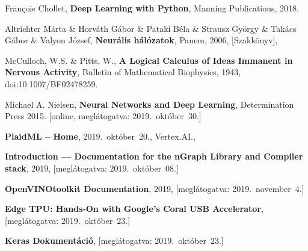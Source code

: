\begin{thebibliography}{9}
	François Chollet,
	\textbf{Deep Learning with Python},
	Manning Publications,
	2018.

	Altrichter Márta \& Horváth Gábor \& Pataki Béla \& Strausz György \& Takács Gábor \& Valyon József,
	\textbf{Neurális hálózatok},
	Panem,
	2006,
	[Szakkönyv],

	McCulloch, W.S. \& Pitts, W.,
	\textbf{A Logical Calculus of Ideas Immanent in Nervous Activity},
	Bulletin of Mathematical Biophysics,
	1943,
	doi:10.1007/BF02478259.

	Michael A. Nielsen,
	\textbf{Neural Networks and Deep Learning},
	Determination Press
	2015.
	[online, meglátogatva: 2019.~október~30.]
	



	\textbf{PlaidML -- Home},
	2019.~október~20.,
	Vertex.AI.,

	\textbf{Introduction --- Documentation for the {nGraph} Library and Compiler stack},
	2019,
	[meglátogatva: 2019.~október~08.]

	\textbf{OpenVINO\textsuperscript{\texttrademark}\space toolkit Documentation},
	2019,
	[meglátogatva: 2019.~november~4.]


	\textbf{Edge TPU: Hands-On with Google’s Coral USB Accelerator},
	[meglátogatva: 2019.~október~23.]

	\textbf{Keras Dokumentáció},
	[meglátogatva: 2019.~október~23.]


\end{thebibliography}
